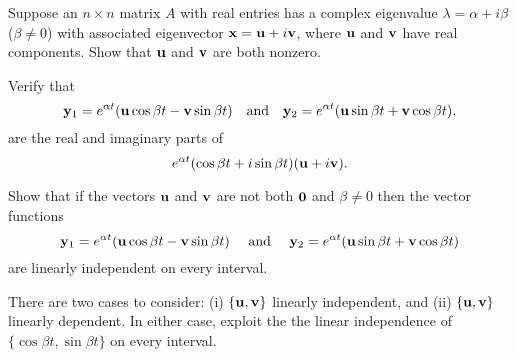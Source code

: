 \documentclass{ximera}
\begin{document}
 \begin{problem}\label{exer:10.6.25}
Suppose an $n\times n$ matrix $A$ with
real entries has a complex eigenvalue $\lambda=\alpha+i\beta$
($\beta\ne0$) with associated eigenvector ${\bf x}={\bf u}+i{\bf v}$,
where ${\bf u}$ and ${\bf v}$ have real components. Show that ${\bf
u}$ and ${\bf v}$ are both nonzero.
\end{problem}

 \begin{problem}\label{exer:10.6.26}
Verify that
$$
{\bf y}_1=e^{\alpha t}({\bf u}\cos\beta t-{\bf v}\sin\beta t)
\mbox{\quad and\quad}
{\bf y}_2=e^{\alpha t}({\bf u}\sin\beta t+{\bf v}\cos\beta t),
$$
are the real and imaginary parts of
$$
e^{\alpha t}(\cos\beta t+i\sin\beta t)({\bf u}+i{\bf v}).
$$
\end{problem}

 \begin{problem}\label{exer:10.6.27}
 Show that if the vectors ${\bf u}$ and ${\bf v}$ are not both ${\bf
0}$ and $\beta\ne0$ then the vector functions
$$
{\bf y}_1=e^{\alpha t}({\bf u}\cos\beta t-{\bf v}\sin\beta t)\quad
\mbox{ and }\quad
{\bf y}_2=e^{\alpha t}({\bf u}\sin\beta t+{\bf v}\cos\beta t)
$$
are linearly independent on every interval. 
\begin{hint}There are
two
cases to consider: {\rm(i)} $\{{\bf u},{\bf v}\}$ linearly
independent, and {\rm(ii)}
 $\{{\bf u},{\bf v}\}$ linearly dependent. In either case, exploit the
the linear independence of $\{\cos\beta t,\sin\beta t\}$
on every interval.
\end{hint}
\end{problem}
\end{document}
